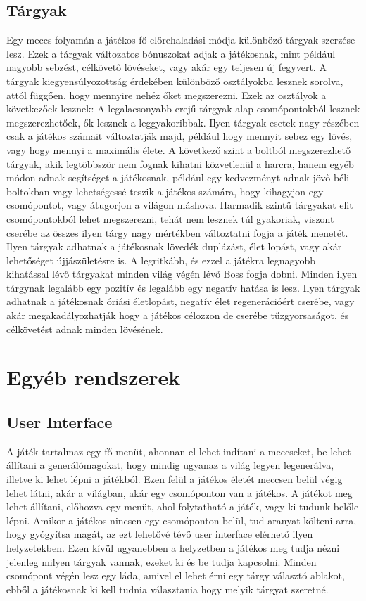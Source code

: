 \documentclass[
]{thesis-ekf}
\theoremstyle{definition}
\theoremstyle{remark}
\begin{document}
	\subsection{Tárgyak}
	Egy meccs folyamán a játékos fő előrehaladási módja különböző tárgyak szerzése lesz. Ezek a tárgyak változatos bónuszokat adjak a játékosnak, mint például nagyobb sebzést, célkövető lövéseket, vagy akár egy teljesen új fegyvert. A tárgyak kiegyensúlyozottság érdekében különböző osztályokba lesznek sorolva, attól függően, hogy mennyire nehéz őket megszerezni. Ezek az osztályok a következőek lesznek:
	A legalacsonyabb erejű tárgyak alap csomópontokból lesznek megszerezhetőek, ők lesznek a leggyakoribbak. Ilyen tárgyak esetek nagy részében csak a játékos számait változtatják majd, például hogy mennyit sebez egy lövés, vagy hogy mennyi a maximális élete.
	A következő szint a boltból megszerezhető tárgyak, akik legtöbbször nem fognak kihatni közvetlenül a harcra, hanem egyéb módon adnak segítséget a játékosnak, például egy kedvezményt adnak jövő béli boltokban vagy lehetségessé teszik a játékos számára, hogy kihagyjon egy csomópontot, vagy átugorjon a világon máshova.
	Harmadik szintű tárgyakat elit csomópontokból lehet megszerezni, tehát nem lesznek túl gyakoriak, viszont cserébe az összes ilyen tárgy nagy mértékben változtatni fogja a játék menetét. Ilyen tárgyak adhatnak a játékosnak lövedék duplázást, élet lopást, vagy akár lehetőséget újjászületésre is.
	A legritkább, és ezzel a játékra legnagyobb kihatással lévő tárgyakat minden világ végén lévő Boss fogja dobni. Minden ilyen tárgynak legalább egy pozitív és legalább egy negatív hatása is lesz. Ilyen tárgyak adhatnak a játékosnak óriási életlopást, negatív élet regenerációért cserébe, vagy akár megakadályozhatják hogy a játékos célozzon de cserébe tűzgyorsaságot, és célkövetést adnak minden lövésének.
	
	\section{Egyéb rendszerek}
	\subsection{User Interface}
	A játék tartalmaz egy fő menüt, ahonnan el lehet indítani a meccseket, be lehet állítani a generálómagokat, hogy mindig ugyanaz a világ legyen legenerálva, illetve ki lehet lépni a játékból.
	Ezen felül a játékos életét meccsen belül végig lehet látni, akár a világban, akár egy csomóponton van a játékos.
	A játékot meg lehet állítani, előhozva egy menüt, ahol folytatható a játék, vagy ki tudunk belőle lépni.
	Amikor a játékos nincsen egy csomóponton belül, tud aranyat költeni arra, hogy gyógyítsa magát, az ezt lehetővé tévő user interface elérhető ilyen helyzetekben.
	Ezen kívül ugyanebben a helyzetben a játékos meg tudja nézni jelenleg milyen tárgyak vannak, ezeket ki és be tudja kapcsolni.
	Minden csomópont végén lesz egy láda, amivel el lehet érni egy tárgy választó ablakot, ebből a játékosnak ki kell tudnia választania hogy melyik tárgyat szeretné.
\end{document}
